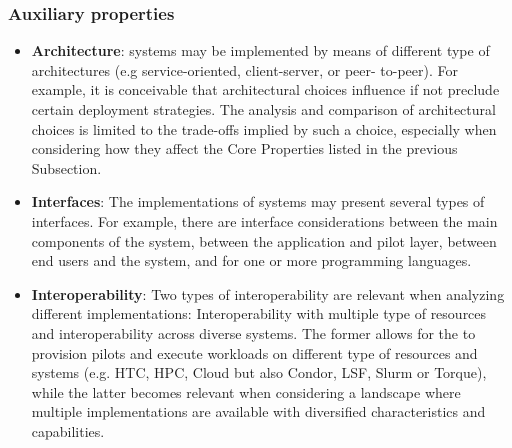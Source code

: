 \documentclass{sig-alternate}
\begin{document}

\subsubsection{Auxiliary properties}

\begin{itemize}

\item \textbf{Architecture}: \pilotjob systems may be implemented by
  means of different type of architectures (e.g service-oriented,
  client-server, or peer- to-peer). For example, it is conceivable
  that architectural choices influence if not preclude certain
  deployment strategies. The analysis and comparison of architectural
  choices is limited to the trade-offs implied by such a choice,
  especially when considering how they affect the Core Properties
  listed in the previous Subsection.



\item \textbf{Interfaces}: The implementations of \pilotjob systems
  may present several types of interfaces. For example, there are
  interface considerations between the main components of the
  \pilotjob system, between the application and pilot layer, between
  end users and the \pilotjob system, and for one or more programming
  languages.

\item \textbf{Interoperability}: Two types of interoperability are
  relevant when analyzing different \pilotjob implementations:
  Interoperability with multiple type of resources and
  interoperability across diverse \pilotjob systems. The former allows
  for the \pilotjob to provision pilots and execute workloads on
  different type of resources and systems (e.g. HTC, HPC, Cloud but
  also Condor, LSF, Slurm or Torque), while the latter becomes
  relevant when considering a landscape where multiple \pilotjob
  implementations are available with diversified characteristics and
  capabilities.


\end{itemize}
\end{document}
